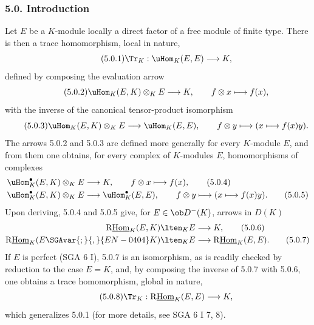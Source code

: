\subsubsection*{5.0. Introduction}

Let $E$ be a $K$-module locally a direct factor of a free module of finite type. There is then a trace homomorphism, local in nature,
\begin{equation}\tag{5.0.1}
\Tr_K:\uHom_K(E,E)\longrightarrow K,
\end{equation}
defined by composing the evaluation arrow
\begin{equation}\tag{5.0.2}
\uHom_K(E,K)\otimes_KE\longrightarrow K,\qquad f\otimes x\longmapsto f(x),
\end{equation}
with the inverse of the canonical tensor-product isomorphism
\begin{equation}\tag{5.0.3}
\uHom_K(E,K)\otimes_KE\longrightarrow\uHom_K(E,E),\qquad f\otimes y\longmapsto (x\longmapsto f(x)y).
\end{equation}
The arrows 5.0.2 and 5.0.3 are defined more generally for every $K$-module $E$, and from them one obtains, for every complex of $K$-modules $E$, homomorphisms of complexes
\begin{align}
\uHom_K^\bullet(E,K)\otimes_KE&\longrightarrow K,\qquad f\otimes x\longmapsto f(x),\tag{5.0.4}\\
\uHom_K^\bullet(E,K)\otimes_KE&\longrightarrow \uHom_K^\bullet(E,E),\qquad f\otimes y\longmapsto (x\longmapsto f(x)y).\tag{5.0.5}
\end{align}
Upon deriving, 5.0.4 and 5.0.5 give, for $E\in\ob D^-(K)$, arrows in $D(K)$
\begin{align}
\mathrm{R}\underline{\mathrm{Hom}}_K(E,K)\lten_KE&\longrightarrow K,\tag{5.0.6}\\
\mathrm{R}\underline{\mathrm{Hom}}_K(E\SGAvar{;}{,}{EN-0404}K)\lten_KE&\longrightarrow\mathrm{R}\underline{\mathrm{Hom}}_K(E,E).\tag{5.0.7}
\end{align}
If $E$ is perfect (SGA 6 I), 5.0.7 is an isomorphism, as is readily checked by reduction to the case $E=K$, and, by composing the inverse of 5.0.7 with 5.0.6, one obtains a trace homomorphism, global in nature,
\begin{equation}\tag{5.0.8}
\Tr_K:\mathrm{R}\underline{\mathrm{Hom}}_K(E,E)\longrightarrow K,
\end{equation}
which generalizes 5.0.1 (for more details, see SGA 6 I 7, 8).

